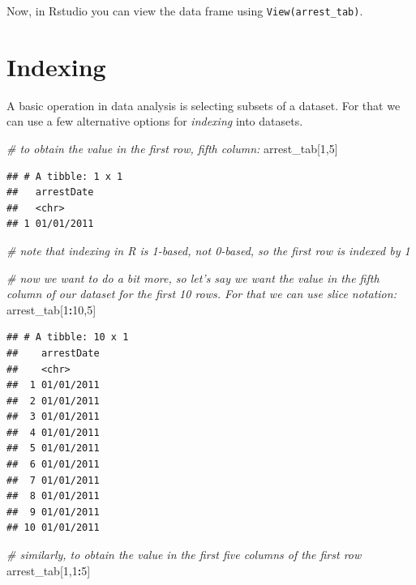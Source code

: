 \documentclass[12pt,]{book}
\newenvironment{Shaded}{\begin{snugshade}}{\end{snugshade}}
\newcommand{\DecValTok}[1]{\textcolor[rgb]{0.00,0.00,0.81}{#1}}
\newcommand{\CommentTok}[1]{\textcolor[rgb]{0.56,0.35,0.01}{\textit{#1}}}
\newcommand{\OperatorTok}[1]{\textcolor[rgb]{0.81,0.36,0.00}{\textbf{#1}}}
\newcommand{\NormalTok}[1]{#1}
\theoremstyle{definition}
\theoremstyle{definition}
\theoremstyle{definition}
\theoremstyle{remark}
\begin{document}
Now, in Rstudio you can view the data frame using
\texttt{View(arrest\_tab)}.

\section{Indexing}\label{indexing}

A basic operation in data analysis is selecting subsets of a dataset.
For that we can use a few alternative options for \emph{indexing} into
datasets.

\begin{Shaded}
\begin{Highlighting}[]
\CommentTok{# to obtain the value in the first row, fifth column:}
\NormalTok{arrest_tab[}\DecValTok{1}\NormalTok{,}\DecValTok{5}\NormalTok{]}
\end{Highlighting}
\end{Shaded}

\begin{verbatim}
## # A tibble: 1 x 1
##   arrestDate
##   <chr>     
## 1 01/01/2011
\end{verbatim}

\begin{Shaded}
\begin{Highlighting}[]
\CommentTok{# note that indexing in R is 1-based, not 0-based, so the first row is indexed by 1}

\CommentTok{# now we want to do a bit more, so let's say we want the value in the fifth column of our dataset for the first 10 rows. For that we can use slice notation:}
\NormalTok{arrest_tab[}\DecValTok{1}\OperatorTok{:}\DecValTok{10}\NormalTok{,}\DecValTok{5}\NormalTok{]}
\end{Highlighting}
\end{Shaded}

\begin{verbatim}
## # A tibble: 10 x 1
##    arrestDate
##    <chr>     
##  1 01/01/2011
##  2 01/01/2011
##  3 01/01/2011
##  4 01/01/2011
##  5 01/01/2011
##  6 01/01/2011
##  7 01/01/2011
##  8 01/01/2011
##  9 01/01/2011
## 10 01/01/2011
\end{verbatim}

\begin{Shaded}
\begin{Highlighting}[]
\CommentTok{# similarly, to obtain the value in the first five columns of the first row}
\NormalTok{arrest_tab[}\DecValTok{1}\NormalTok{,}\DecValTok{1}\OperatorTok{:}\DecValTok{5}\NormalTok{]}
\end{Highlighting}
\end{Shaded}
\end{document}
